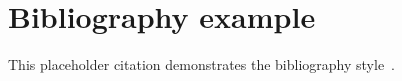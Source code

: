 \documentclass{article}
\begin{document}
\section*{Bibliography example}
This placeholder citation demonstrates the bibliography style~\cite{example}.


\end{document}
